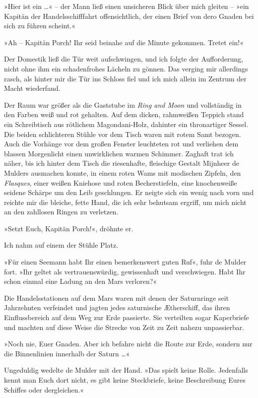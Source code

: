 »Hier ist ein \ldots{}« – der Mann ließ einen unsicheren Blick über mich
gleiten – »ein Kapitän der Handelsschifffahrt offensichtlich, der
einen Brief von dero Gnaden bei sich zu führen scheint.«

»Ah – Kapitän Porch! Ihr seid beinahe auf die Minute gekommen.
Tretet ein!«

Der Domestik ließ die Tür weit aufschwingen, und ich folgte der
Aufforderung, nicht ohne ihm ein schadenfrohes Lächeln zu gönnen.
Das verging mir allerdings rasch, als hinter mir die Tür ins
Schloss fiel und ich mich allein im Zentrum der Macht wiederfand.

Der Raum war größer als die Gaststube im \emph{Ring and Moon} und
vollständig in den Farben weiß und rot gehalten. Auf dem dicken,
rahmweißen Teppich stand ein Schreibtisch aus rötlichem
Magondani-Holz, dahinter ein thronartiger Sessel. Die beiden
schlichteren Stühle vor dem Tisch waren mit rotem Samt bezogen.
Auch die Vorhänge vor dem großen Fenster leuchteten rot und
verliehen dem blassen Morgenlicht einen unwirklichen warmen
Schimmer. Zaghaft trat ich näher, bis ich hinter dem Tisch die
riesenhafte, fleischige Gestalt Mijnheer de Mulders ausmachen
konnte, in einem roten Wams mit modischen Zipfeln, den
\emph{Flasques}, einer weißen Kniehose und roten Becherstiefeln,
eine knochenweiße seidene Schärpe um den Leib geschlungen. Er
neigte sich ein wenig nach vorn und reichte mir die bleiche, fette
Hand, die ich sehr behutsam ergriff, um mich nicht an den zahllosen
Ringen zu verletzen.

\bigpar

»Setzt Euch, Kapitän Porch!«, dröhnte er.

Ich nahm auf einem der Stühle Platz.

»Für einen Seemann habt Ihr einen bemerkenswert guten Ruf«, fuhr de
Mulder fort. »Ihr geltet als vertrauenswürdig, gewissenhaft und
verschwiegen. Habt Ihr schon einmal eine Ladung an den Mars
verloren?«

Die Handelsstationen auf dem Mars waren mit denen der Saturnringe
seit Jahrzehnten verfeindet und jagten jedes saturnische
Ætherschiff, das ihren Einflussbereich auf dem Weg zur Erde
passierte. Sie verteilten sogar Kaperbriefe und machten auf diese
Weise die Strecke von Zeit zu Zeit nahezu unpassierbar.

»Noch nie, Euer Gnaden. Aber ich befahre nicht die Route zur Erde,
sondern nur die Binnenlinien innerhalb der Saturn \ldots{}«

Ungeduldig wedelte de Mulder mit der Hand. »Das spielt keine Rolle.
Jedenfalls kennt man Euch dort nicht, es gibt keine Steckbriefe,
keine Beschreibung Eures Schiffes oder dergleichen.«

